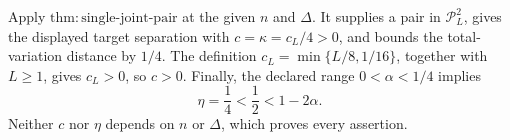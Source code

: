 Apply \(\mathrm{thm:single\text{-}joint\text{-}pair}\) at the given \(n\) and \(\Delta\).  It supplies a pair in \(\mathcal P_L^2\), gives the displayed target separation with \(c=\kappa=c_L/4>0\), and bounds the total-variation distance by \(1/4\).  The definition \(c_L=\min\{L/8,1/16\}\), together with \(L\geq1\), gives \(c_L>0\), so \(c>0\).  Finally, the declared range \(0<\alpha<1/4\) implies
\[
 \eta=\frac14<\frac12<1-2\alpha.
\]
Neither \(c\) nor \(\eta\) depends on \(n\) or \(\Delta\), which proves every assertion.